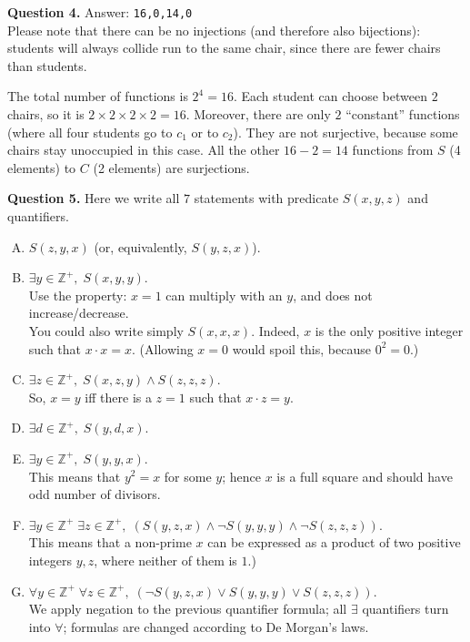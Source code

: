 \documentclass[jou]{apa6}
\begin{document}
\vspace{6pt}
{\bf Question 4.} Answer: {\tt 16,0,14,0}\\
Please note that there can be no injections (and therefore also bijections): 
students will always collide \textendash{} run to the same chair, 
since there are fewer chairs than students.

The total number of functions is $2^4 = 16$. Each student
can choose between $2$ chairs, so it is $2 \times 2 \times 2 \times 2 = 16$. 
Moreover, there are only $2$ ``constant'' functions (where all four
students go to $c_1$ or to $c_2$). They are not surjective, because
some chairs stay unoccupied in this case. 
All the other $16 - 2 = 14$ functions from $S$ (4 elements) to $C$ (2 elements)
are surjections. 

\vspace{6pt}
{\bf Question 5.} Here we write all $7$ statements with predicate $S(x,y,z)$ and quantifiers. 

\begin{enumerate}[(A)]
\item $S(z,y,x)$ (or, equivalently, $S(y,z,x)$). 
\item $\exists y \in \mathbb{Z}^{+},\; S(x,y,y)$.\\
Use the property: $x = 1$ can multiply with an $y$, and does not increase/decrease. \\
You could also write simply $S(x,x,x)$. Indeed, $x$ is the only 
positive integer such that $x \cdot x = x$. (Allowing $x = 0$ would 
spoil this, because $0^2 = 0$.)
\item $\exists z \in \mathbb{Z}^{+},\; S(x,z,y) \wedge S(z,z,z)$.\\
So, $x = y$ iff there is a $z = 1$ such that $x \cdot z = y$.
\item $\exists d \in \mathbb{Z}^{+},\; S(y,d,x)$.
\item $\exists y \in \mathbb{Z}^{+},\; S(y,y,x)$.\\ 
This means that $y^2 = x$ for some $y$; 
hence $x$ is a full square and should have odd number of divisors.
\item $\exists y \in \mathbb{Z}^{+}\;\exists z \in \mathbb{Z}^{+},\;(S(y,z,x) \wedge \neg S(y,y,y) \wedge \neg S(z,z,z))$.\\
This means that a non-prime $x$ can be expressed as a product of two positive integers $y,z$, 
where neither of them is $1$.)
\item $\forall y \in \mathbb{Z}^{+}\;\forall z \in \mathbb{Z}^{+},\;(\neg S(y,z,x) \vee S(y,y,y) \vee S(z,z,z))$.\\
We apply negation to the previous quantifier formula; all $\exists$ quantifiers turn into $\forall$; 
formulas are changed according to De Morgan's laws.
\end{enumerate}
\end{document}
